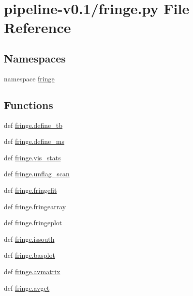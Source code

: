 \hypertarget{pipeline-v0_81_2fringe_8py}{\section{pipeline-\/v0.1/fringe.py \-File \-Reference}
\label{pipeline-v0_81_2fringe_8py}
}
\subsection*{\-Namespaces}
\begin{DoxyCompactItemize}
\item 
namespace \hyperlink{namespacefringe}{fringe}
\end{DoxyCompactItemize}
\subsection*{\-Functions}
\begin{DoxyCompactItemize}
\item 
def \hyperlink{namespacefringe_a606228b53d83d89f8b5fe29f5c11e08e}{fringe.\-define\-\_\-tb}
\item 
def \hyperlink{namespacefringe_a76e67dab65fbc81cb2a7f6491d349204}{fringe.\-define\-\_\-ms}
\item 
def \hyperlink{namespacefringe_a7b8a26d41af501f4082adaae8342fe36}{fringe.\-vis\-\_\-stats}
\item 
def \hyperlink{namespacefringe_ab6202ab719c67a1ebf62a7450caa4d94}{fringe.\-unflag\-\_\-scan}
\item 
def \hyperlink{namespacefringe_a625bc7e66cee8861021751a36aac78ae}{fringe.\-fringefit}
\item 
def \hyperlink{namespacefringe_ad41c1da665b9a038d2dccd352c431d57}{fringe.\-fringearray}
\item 
def \hyperlink{namespacefringe_a00275e862957e08ba0fa247e35b24c32}{fringe.\-fringeplot}
\item 
def \hyperlink{namespacefringe_a89c0462fcdbad389dd72d33431236299}{fringe.\-issouth}
\item 
def \hyperlink{namespacefringe_a74fb3f6a74f29b490bd589199ad62b7e}{fringe.\-basplot}
\item 
def \hyperlink{namespacefringe_a2533eb716e337d709b2fa1160b5ddeca}{fringe.\-avmatrix}
\item 
def \hyperlink{namespacefringe_a9581786772fb5cf44c880cc0a30380cf}{fringe.\-avget}
\end{DoxyCompactItemize}
